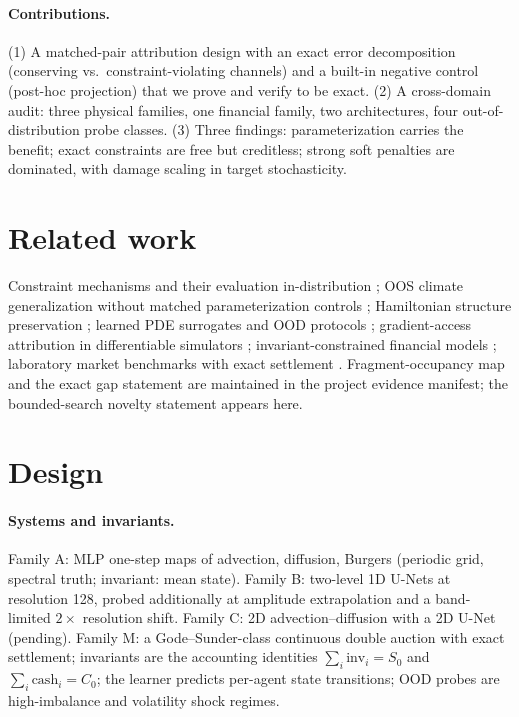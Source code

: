 \documentclass{article}
\begin{document}
\paragraph{Contributions.}
(1) A matched-pair attribution design with an exact error decomposition
(conserving vs.\ constraint-violating channels) and a built-in negative control (post-hoc
projection) that we prove and verify to be exact. (2) A cross-domain audit: three physical
families, one financial family, two architectures, four out-of-distribution probe classes.
(3) Three findings: parameterization carries the benefit; exact constraints are free but
creditless; strong soft penalties are dominated, with damage scaling in target stochasticity.

\section{Related work}
Constraint mechanisms and their evaluation in-distribution \citep{beucler2021}; OOS climate
generalization without matched parameterization controls \citep{beucler2019}; Hamiltonian
structure preservation \citep{greydanus2019}; learned PDE surrogates and OOD protocols
\citep{pdebench,pfaff2021}; gradient-access attribution in differentiable simulators
\citep{suh2022}; invariant-constrained financial models \citep{cohen2023}; laboratory market
benchmarks with exact settlement \citep{godesunder1993}. Fragment-occupancy map and the exact
gap statement are maintained in the project evidence manifest; the bounded-search novelty
statement appears here.

\section{Design}
\paragraph{Systems and invariants.} Family A: MLP one-step maps of advection, diffusion,
Burgers (periodic grid, spectral truth; invariant: mean state). Family B: two-level 1D U-Nets
at resolution 128, probed additionally at amplitude extrapolation and a band-limited $2\times$
resolution shift. Family C: 2D advection--diffusion with a 2D U-Net (pending). Family M: a
Gode--Sunder-class continuous double auction with exact settlement; invariants are the
accounting identities $\sum_i \mathrm{inv}_i = S_0$ and $\sum_i \mathrm{cash}_i = C_0$; the
learner predicts per-agent state transitions; OOD probes are high-imbalance and volatility
shock regimes.
\end{document}
